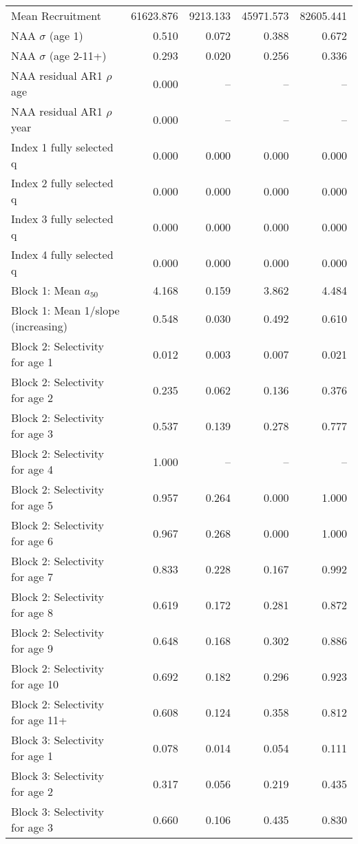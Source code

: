 \documentclass[
]{article}
\begin{document}
\begin{landscape}
\begin{longtable}[t]{lrrrr}
\endfoot
\bottomrule
\endlastfoot
Mean Recruitment & 61623.876 & 9213.133 & 45971.573 & 82605.441\\
NAA $\sigma$ (age 1) & 0.510 & 0.072 & 0.388 & 0.672\\
NAA $\sigma$ (age 2-11+) & 0.293 & 0.020 & 0.256 & 0.336\\
NAA residual AR1 $\rho$ age & 0.000 & -- & -- & --\\
NAA residual AR1 $\rho$ year & 0.000 & -- & -- & --\\
\addlinespace
Index 1 fully selected q & 0.000 & 0.000 & 0.000 & 0.000\\
Index 2 fully selected q & 0.000 & 0.000 & 0.000 & 0.000\\
Index 3 fully selected q & 0.000 & 0.000 & 0.000 & 0.000\\
Index 4 fully selected q & 0.000 & 0.000 & 0.000 & 0.000\\
Block 1: Mean $a_{50}$ & 4.168 & 0.159 & 3.862 & 4.484\\
\addlinespace
Block 1: Mean 1/slope (increasing) & 0.548 & 0.030 & 0.492 & 0.610\\
Block 2: Selectivity for age 1 & 0.012 & 0.003 & 0.007 & 0.021\\
Block 2: Selectivity for age 2 & 0.235 & 0.062 & 0.136 & 0.376\\
Block 2: Selectivity for age 3 & 0.537 & 0.139 & 0.278 & 0.777\\
Block 2: Selectivity for age 4 & 1.000 & -- & -- & --\\
\addlinespace
Block 2: Selectivity for age 5 & 0.957 & 0.264 & 0.000 & 1.000\\
Block 2: Selectivity for age 6 & 0.967 & 0.268 & 0.000 & 1.000\\
Block 2: Selectivity for age 7 & 0.833 & 0.228 & 0.167 & 0.992\\
Block 2: Selectivity for age 8 & 0.619 & 0.172 & 0.281 & 0.872\\
Block 2: Selectivity for age 9 & 0.648 & 0.168 & 0.302 & 0.886\\
\addlinespace
Block 2: Selectivity for age 10 & 0.692 & 0.182 & 0.296 & 0.923\\
Block 2: Selectivity for age 11+ & 0.608 & 0.124 & 0.358 & 0.812\\
Block 3: Selectivity for age 1 & 0.078 & 0.014 & 0.054 & 0.111\\
Block 3: Selectivity for age 2 & 0.317 & 0.056 & 0.219 & 0.435\\
Block 3: Selectivity for age 3 & 0.660 & 0.106 & 0.435 & 0.830\\

\end{longtable}
\end{landscape}
\end{document}
